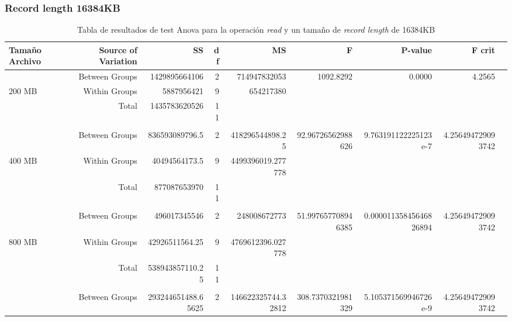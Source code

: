 \begin{landscape}
\subsubsection{Record length 16384KB}
\begin{table}[!htp]\centering
\caption{Tabla de resultados de test Anova para la operación \textit{read} y un tamaño de \textit{record length} de 16384KB}\label{tab: }
\scriptsize
\begin{tabular}{lrrrrrrrr}\toprule
Tamaño Archivo &Source of Variation &SS &df &MS &F &P-value &F crit \\\midrule
&Between Groups &1429895664106 &2 &714947832053 &1092.8292 &0.0000 &4.2565 \\
200 MB &Within Groups &5887956421 &9 &654217380 & & & \\
&Total &1435783620526 &11 & & & & \\
& & & & & & & \\
&Between Groups &836593089796.5 &2 &418296544898.25 &92.96726562988626 &9.763191122225123e-7 &4.256494729093742 \\
400 MB &Within Groups &40494564173.5 &9 &4499396019.277778 & & & \\
&Total &877087653970 &11 & & & & \\
& & & & & & & \\
&Between Groups &496017345546 &2 &248008672773 &51.997657708946385 &0.00001135845646826894 &4.256494729093742 \\
800 MB &Within Groups &42926511564.25 &9 &4769612396.027778 & & & \\
&Total &538943857110.25 &11 & & & & \\
& & & & & & & \\
&Between Groups &293244651488.65625 &2 &146622325744.32812 &308.7370321981329 &5.105371569946726e-9 &4.256494729093742 \\

\end{tabular}
\end{table}
\end{landscape}
